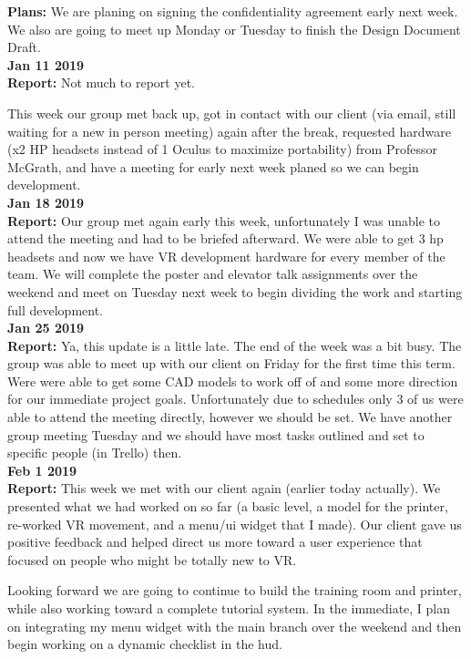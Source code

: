 \textbf{Plans:} 
We are planing on signing the confidentiality agreement early next week. We also are going to meet up Monday or Tuesday to finish the Design Document Draft. \\


\textbf{Jan 11 2019}\\
\textbf{Report:}
Not much to report yet.

This week our group met back up, got in contact with our client (via email, still waiting for a new in person meeting) again after the break, requested hardware (x2 HP headsets instead of 1 Oculus to maximize portability) from Professor McGrath, and have a meeting for early next week planed so we can begin development.  \\

\textbf{Jan 18 2019}\\
\textbf{Report:} 
Our group met again early this week, unfortunately I was unable to attend the meeting and had to be briefed afterward. We were able to get 3 hp headsets and now we have VR development hardware for every member of the team. We will complete the poster and elevator talk assignments over the weekend and meet on Tuesday next week to begin dividing the work and starting full development. \\

\textbf{Jan 25 2019}\\
\textbf{Report:} 
Ya, this update is a little late. The end of the week was a bit busy. The group was able to meet up with our client on Friday for the first time this term. Were were able to get some CAD models to work off of and some more direction for our immediate project goals. Unfortunately due to schedules only 3 of us were able to attend the meeting directly, however we should be set. We have another group meeting Tuesday and we should have most tasks outlined and set to specific people (in Trello) then.\\

\textbf{Feb 1 2019}\\

\textbf{Report:}
This week we met with our client again (earlier today actually). We presented what we had worked on so far (a basic level, a model for the printer, re-worked VR movement, and a menu/ui widget that I made). Our client gave us positive feedback and helped direct us more toward a user experience that focused on people who might be totally new to VR. 

Looking forward we are going to continue to build the training room and printer, while also working toward a complete tutorial system. In the immediate, I plan on integrating my menu widget with the main branch over the weekend and then begin working on a dynamic checklist in the hud.\\

